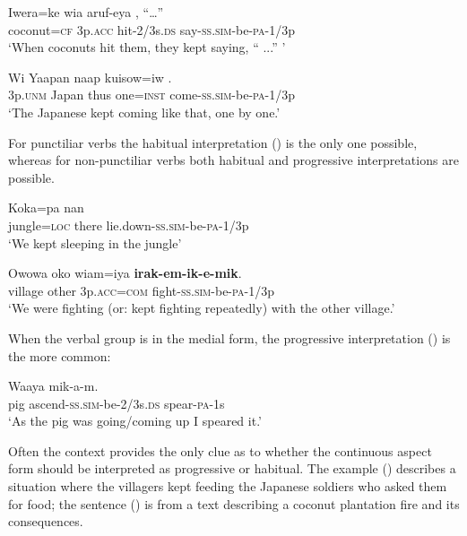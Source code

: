 \ea%
\label{ex:x350}
\gll Iwera=ke wia aruf-eya , ``{\dots''} \\
coconut=\textsc{cf} 3p.\textsc{acc} hit-2/3s.\textsc{ds} say-\textsc{ss}.\textsc{sim}-be-\textsc{pa}-1/3p \\
\glt`When coconuts hit them, they kept saying, `` ...'' '
\z

\ea%
\label{ex:x1045}
\gll Wi Yaapan naap kuisow=iw . \\
3p.\textsc{unm} Japan thus one=\textsc{inst} come-\textsc{ss}.\textsc{sim}-be-\textsc{pa}-1/3p\\
\glt`The Japanese kept coming like that, one by one.'
\z

For punctiliar verbs the habitual interpretation () is the only one possible, whereas for non-punctiliar verbs both habitual and progressive interpretations are possible.

\ea%
\label{ex:x351}
\gll Koka=pa nan  \\
jungle=\textsc{loc} there lie.down-\textsc{ss}.\textsc{sim}-be-\textsc{pa}-1/3p\\
\glt`We kept sleeping in the jungle'
\z

\ea%
\label{ex:x1932}
\gll Owowa oko wiam=iya \textbf{irak-em-ik-e-mik}. \\
village other 3p.\textsc{acc}=\textsc{com} fight-\textsc{ss}.\textsc{sim}-be-\textsc{pa}-1/3p\\
\glt`We were fighting (or: kept fighting repeatedly) with the other village.'
\z

 When the verbal group is in the medial form, the progressive interpretation () is the more common:

\ea%
\label{ex:x353}
\gll Waaya   mik-a-m. \\
pig ascend-\textsc{ss}.\textsc{sim}-be-2/3s.\textsc{ds} spear-\textsc{pa}-1s\\
\glt`As the pig was going/coming up I speared it.'
\z

Often the context provides the only clue as to whether the continuous aspect form should be interpreted as progressive or habitual. The example () describes a situation where the villagers kept feeding the Japanese soldiers who asked them for food; the sentence () is from a text describing a coconut plantation fire and its consequences.

